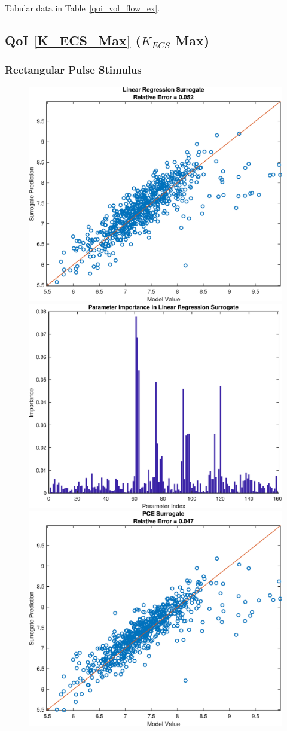 \documentclass[12pt]{article}
\numberwithin{equation}{section}
\begin{document}
Tabular data in Table~\ref{qoi_vol_flow_ex}.

\newpage

\subsection{QoI \eqref{K_ECS_Max} ($K_{ECS}$ Max)}

\newpage

\subsubsection{Rectangular Pulse Stimulus}

\begin{figure}[h]
\centering
\includegraphics[width=.49 \textwidth]{Figures/K_ECS_Max_QoI_LR_Prediction_Rectangular.eps}
\includegraphics[width=.49 \textwidth]{Figures/K_ECS_Max_QoI_LR_VI_Rectangular.eps}\\
\includegraphics[width=.49 \textwidth]{Figures/K_ECS_Max_QoI_PCE_Prediction_Rectangular.eps}

\end{figure}
\end{document}
